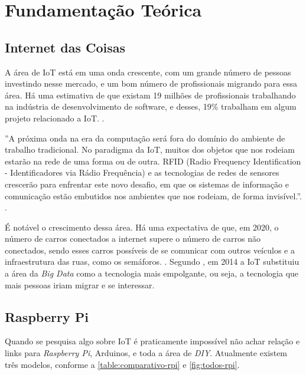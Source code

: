 \chapter{Fundamentação Teórica}\label{cap:fundamentacao-teorica}

\section{Internet das Coisas}\label{sec:internet-das-coisas}

A área de IoT está em uma onda crescente, com um grande número de pessoas investindo nesse mercado, e um bom número de profissionais migrando para essa área. Há uma estimativa de que existam 19 milhões de profissionais trabalhando na indústria de desenvolvimento de software, e desses, 19\% trabalham em algum projeto relacionado a IoT. \cite{cw-iot}.

\begin{citacao}
''A próxima onda na era da computação será fora do domínio do ambiente de trabalho tradicional. No paradigma da IoT, muitos dos objetos que nos rodeiam estarão na rede de uma forma ou de outra. RFID (Radio Frequency Identification - Identificadores via Rádio Frequência) e as tecnologias de redes de sensores crescerão para enfrentar este novo desafio, em que os sistemas de informação e comunicação estão embutidos nos ambientes que nos rodeiam, de forma invisível.''. \cite{iot-article}. 
\end{citacao}

É notável o crescimento dessa área. Há uma expectativa de que, em 2020, o número de carros conectados a internet supere o número de carros não conectados, sendo esses carros possíveis de se comunicar com outros veículos e a infraestrutura das ruas, como os semáforos. \cite{goldmansachs-iot}. Segundo , em 2014 a IoT substituiu a área da \textit{Big Data} como a tecnologia mais empolgante, ou seja, a tecnologia que mais pessoas iriam migrar e se interessar. 


\section{Raspberry Pi}\label{sec:raspberry-pi}

Quando se pesquisa algo sobre IoT é praticamente impossível não achar relação e links para \textit{Raspberry Pi}, Arduinos, e toda a área de \textit{DIY}. Atualmente existem três modelos, conforme a \autoref{table:comparativo-rpi} e \autoref{fig:todos-rpi}. 

